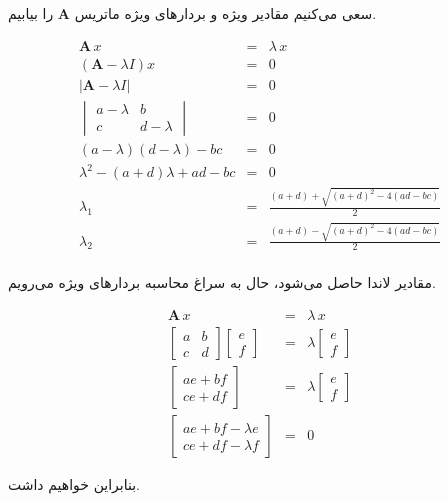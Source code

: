 \documentclass[14pt,a4]{article}
\begin{document}
سعی می‌کنیم مقادیر ویژه و بردار‌های ویژه ماتریس $\textbf{A}$ را بیابیم.

\begin{eqnarray*}
    \textbf{A}\,x & = & \lambda \, x \\
    (\textbf{A} - \lambda I) x & = & 0 \\
    |\textbf{A} - \lambda I| & = & 0 \\
    \begin{vmatrix}a-\lambda & b \\ c & d - \lambda \end{vmatrix} & = & 0 \\
    (a-\lambda)(d - \lambda) - bc & = & 0 \\
    \lambda^2 - (a+d)\lambda + ad - bc & = & 0 \\
    \lambda_1 & = & \frac{(a+d) + \sqrt{(a+d)^2-4(ad-bc)}}{2} \\
    \lambda_2 & = & \frac{(a+d) - \sqrt{(a+d)^2-4(ad-bc)}}{2} \\
\end{eqnarray*}

مقادیر لاندا حاصل می‌شود، حال به سراغ محاسبه‌ بردارهای ویژه می‌رویم.

\begin{eqnarray*}
    \textbf{A}\,x & = & \lambda \, x \\
    \begin{bmatrix}a & b\\c & d\end{bmatrix}\begin{bmatrix}e\\ f\end{bmatrix} & = & \lambda \begin{bmatrix}e\\ f\end{bmatrix} \\
    \begin{bmatrix}ae + bf\\ce + df \end{bmatrix} & = & \lambda \begin{bmatrix}e\\ f\end{bmatrix} \\
    \begin{bmatrix}ae + bf - \lambda e\\ce + df - \lambda f\end{bmatrix} & = & 0
\end{eqnarray*}

بنابراین خواهیم داشت.
\end{document}
